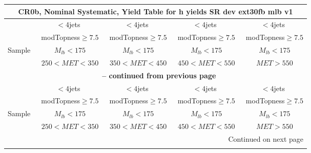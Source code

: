 \documentclass{article}
\begin{document}
 
 
 
 
\pagebreak 

 
 
 
 
\begin{longtable}{|l|c|c|c|c|} 
 
\multicolumn{5}{c}{ CR0b, Nominal Systematic, Yield Table for h yields SR dev ext30fb mlb v1 }\\* \hline 
  & $<4$jets  & $<4$jets  & $<4$jets  & $<4$jets \\* 
  & ~modTopness$\ge7.5$  & ~modTopness$\ge7.5$  & ~modTopness$\ge7.5$  & ~modTopness$\ge7.5$ \\* 
Sample  & ~$M_{lb}<175$  & ~$M_{lb}<175$  & ~$M_{lb}<175$  & ~$M_{lb}<175$ \\* 
  & ~$250<MET<350$  & ~$350<MET<450$  & ~$450<MET<550$  & ~$MET>550$ \\* 
\hline \hline 
\endfirsthead 
 
\multicolumn{5}{c}{{\bfseries \tablename\ \thetable{} -- continued from previous page}}\\* \hline 
  & $<4$jets  & $<4$jets  & $<4$jets  & $<4$jets \\* 
  & ~modTopness$\ge7.5$  & ~modTopness$\ge7.5$  & ~modTopness$\ge7.5$  & ~modTopness$\ge7.5$ \\* 
Sample  & ~$M_{lb}<175$  & ~$M_{lb}<175$  & ~$M_{lb}<175$  & ~$M_{lb}<175$ \\* 
  & ~$250<MET<350$  & ~$350<MET<450$  & ~$450<MET<550$  & ~$MET>550$ \\* 
\hline \hline 
\endhead 
 
\multicolumn{5}{|r|}{{Continued on next page}}\\* \hline 
\endfoot 
 
 
\endlastfoot 
 

\end{longtable}
\end{document}

